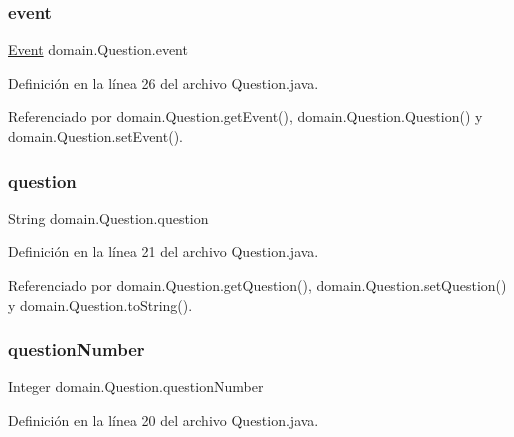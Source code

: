 \subsubsection{\texorpdfstring{event}{event}}
{\footnotesize\ttfamily \mbox{\hyperlink{classdomain_1_1Event}{Event}} domain.\+Question.\+event\hspace{0.3cm}{\ttfamily [private]}}



Definición en la línea 26 del archivo Question.\+java.



Referenciado por domain.\+Question.\+get\+Event(), domain.\+Question.\+Question() y domain.\+Question.\+set\+Event().

\mbox{\label{classdomain_1_1Question_a3f1c6038e83e09658df60eed71e5deb4}} 
\subsubsection{\texorpdfstring{question}{question}}
{\footnotesize\ttfamily String domain.\+Question.\+question\hspace{0.3cm}{\ttfamily [private]}}



Definición en la línea 21 del archivo Question.\+java.



Referenciado por domain.\+Question.\+get\+Question(), domain.\+Question.\+set\+Question() y domain.\+Question.\+to\+String().

\mbox{\label{classdomain_1_1Question_a0570239b13202e004eef891b49db538e}} 
\subsubsection{\texorpdfstring{questionNumber}{questionNumber}}
{\footnotesize\ttfamily Integer domain.\+Question.\+question\+Number\hspace{0.3cm}{\ttfamily [private]}}



Definición en la línea 20 del archivo Question.\+java.



